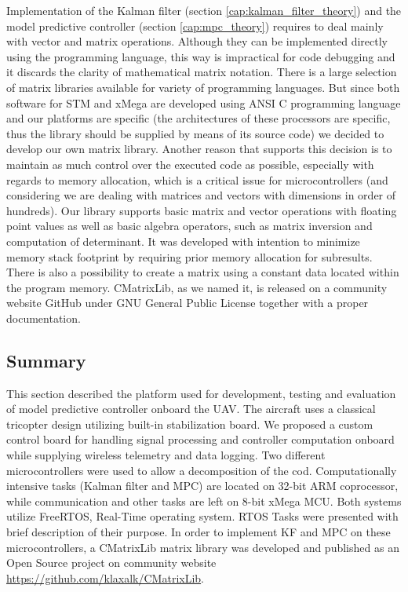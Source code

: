 Implementation of the Kalman filter (section \ref{cap:kalman_filter_theory}) and the model predictive controller (section \ref{cap:mpc_theory}) requires to deal mainly with vector and matrix operations. Although they can be implemented directly using the programming language, this way is impractical for code debugging and it discards the clarity of mathematical matrix notation. There is a large selection of matrix libraries \citep{matrixlibraries} available for variety of programming languages. But since both software for STM and xMega are developed using ANSI C programming language and our platforms are specific (the architectures of these processors are specific, thus the library should be supplied by means of its source code) we decided to develop our own matrix library. Another reason that supports this decision is to maintain as much control over the executed code as possible, especially with regards to memory allocation, which is a critical issue for microcontrollers (and considering we are dealing with matrices and vectors with dimensions in order of hundreds). Our library supports basic matrix and vector operations with floating point values as well as basic algebra operators, such as matrix inversion and computation of determinant. It was developed with intention to minimize memory stack footprint by requiring prior memory allocation for subresults. There is also a possibility to create a matrix using a constant data located within the program memory. CMatrixLib, as we named it, is released on a community website GitHub \citep{cmatrixlib} under GNU General Public License together with a proper documentation.

\subsection{Summary}

This section described the platform used for development, testing and evaluation of model predictive controller onboard the UAV. The aircraft uses a classical tricopter design utilizing built-in stabilization board. We proposed a custom control board for handling signal processing and controller computation onboard while supplying wireless telemetry and data logging. Two different microcontrollers were used to allow a decomposition of the cod. Computationally intensive tasks (Kalman filter and MPC) are located on 32-bit ARM coprocessor, while communication and other tasks are left on 8-bit xMega MCU. Both systems utilize FreeRTOS, Real-Time operating system. RTOS Tasks were presented with brief description of their purpose. In order to implement KF and MPC on these microcontrollers, a CMatrixLib matrix library was developed and published as an Open Source project on community website \url{https://github.com/klaxalk/CMatrixLib}. 